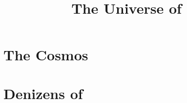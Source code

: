 \documentclass[a4paper,12pt,openany,oneside]{book}
\title{The Universe of \Miith}
\begin{document}
  \stuffatthebeginning



  \part{The Cosmos}
    
    
    
    
  \part{Denizens of \Miith}
    
    
    
    
    \begin{comment}
      \chapter{Azmith}
    \end{comment}
    
    \begin{comment}
      
    \end{comment}



  \begin{comment}
    \part{The Characters of \Miith}
  \end{comment}
    
    
    
    



  \part{\DominatorsofMith}
    
    
    
    
    
    
    
    
  \begin{comment}
    \part{Archons of \Miith}
  \end{comment}
    
  \begin{comment}
    \part{Sentinels of \Miith}
  \end{comment}
    
    \begin{comment}
       
       
       
    \end{comment}
\end{document}
